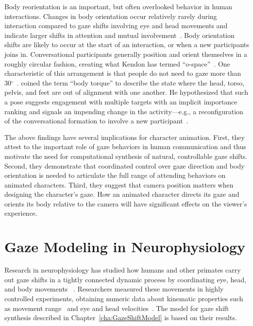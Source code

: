 Body reorientation is an important, but often overlooked behavior in human interactions. Changes in body orientation occur relatively rarely during interaction compared to gaze shifts involving eye and head movements and indicate larger shifts in attention and mutual involvement~\cite{kendon1990conducting,schegloff1998bodytorque}.
Body orientation shifts are likely to occur at the start of an interaction, or when a new participants joins in. Conversational participants generally position and orient themselves in a roughly circular fashion, creating what Kendon has termed ``o-space''~\cite{kendon1990conducting}. One characteristic of this arrangement is that people do not need to gaze more than 30$^{\circ}$~\cite{kendon1990conducting}. \citet{schegloff1998bodytorque} coined the term ``body torque'' to describe the state where the head, torso, pelvis, and feet are out of alignment with one another. He hypothesized that such a pose suggests engagement with multiple targets with an implicit importance ranking and signals an impending change in the activity---e.g., a reconfiguration of the conversational formation to involve a new participant~\cite{kendon1990conducting}.

The above findings have several implications for character animation. First, they attest to the important role of gaze behaviors in human communication and thus motivate the need for computational synthesis of natural, controllable gaze shifts. Second, they demonstrate that coordinated control over gaze direction and body orientation is needed to articulate the full range of attending behaviors on animated characters. Third, they suggest that camera position matters when designing the character's gaze. How an animated character directs its gaze and orients its body relative to the camera will have significant effects on the viewer's experience.

\section{Gaze Modeling in Neurophysiology}

Research in neurophysiology has studied how humans and other primates carry out gaze shifts in a tightly connected dynamic process by coordinating eye, head, and body movements  ~\cite{zangemeister1982types,andredeshays1988eyehead1,barnes1979vor,freedman2000coordination,uemura1980eyehead,mccluskey2007monkeys}. Researchers measured these movements in highly controlled experiments, obtaining numeric data about kinematic properties such as movement range~\cite{guitton1987gaze} and eye and head velocities~\cite{guitton1987gaze,freedman2000coordination,barnes1979vor,uemura1980eyehead}. The model for gaze shift synthesis described in Chapter~\ref{cha:GazeShiftModel} is based on their results.

